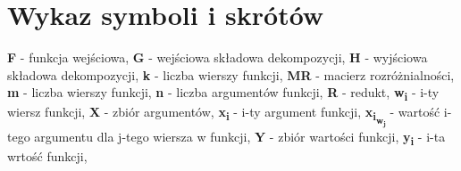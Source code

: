 \chapter*{Wykaz symboli i skrótów}

\noindent
\textbf{F} - funkcja wejściowa, \newline
\textbf{G} - wejściowa składowa dekompozycji, \newline
\textbf{H} - wyjściowa składowa dekompozycji, \newline
\textbf{k} - liczba wierszy funkcji, \newline
\textbf{MR} - macierz rozróżnialności, \newline
\textbf{m} - liczba wierszy funkcji, \newline
\textbf{n} - liczba argumentów funkcji, \newline
\textbf{R} - redukt, \newline
\textbf{w\textsubscript{i}} - i-ty wiersz funkcji,\newline
\textbf{X} - zbiór argumentów, \newline
\textbf{x\textsubscript{i}} - i-ty argument funkcji, \newline
\textbf{x\textsubscript{i\textsubscript{w\textsubscript{j}}}} - wartość i-tego argumentu dla j-tego wiersza w funkcji, \newline
\textbf{Y} - zbiór wartości funkcji, \newline
\textbf{y\textsubscript{i}} - i-ta wrtość funkcji, \newline

\cleardoublepage